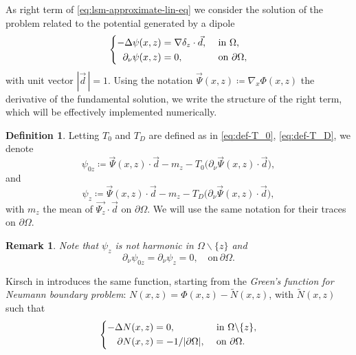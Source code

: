 \documentclass[10pt, a4paper, twoside, openright]{book}
\theoremstyle{definition}
\newtheorem{definition}[subsection]{Definition}
\theoremstyle{plain}
\theoremstyle{plain}
\theoremstyle{plain}
\theoremstyle{plain}
\newtheorem{remark}[subsection]{Remark}
\theoremstyle{plain}
\theoremstyle{plain}
\theoremstyle{plain}
\theoremstyle{plain}
\begin{document}
 As right term of \eqref{eq:lsm-approximate-lin-eq} we consider the solution of the problem related to the potential generated by a dipole
 \begin{equation}
 \left\{
 \begin{aligned}
   -\Delta \psi(x,z) &= \nabla\delta_{z} \cdot \vec{d}, && \textup{ in }\Omega ,\\
   \partial_\nu\psi(x,z) &= 0, &&\textup{ on }\partial \Omega,
 \end{aligned}
 \right.
 \end{equation}
 with unit vector $|\vec{d}\,|=1$. Using the notation $\vec{\Psi}(x,z)\coloneqq\nabla_x\Phi(x,z)$ the derivative of the fundamental solution, we write the structure of the right term, which will be effectively implemented numerically.
 \begin{definition}
 \label{def:lsm-psi}
  Letting $T_0$ and $T_D$ are defined as in \eqref{eq:def-T_0}, \eqref{eq:def-T_D}, we denote
 \begin{equation}
 \psi_{0z} \coloneqq \vec{\Psi}(x,z)\cdot\vec{d} - m_z - T_0\bigl(\partial_\nu \vec{\Psi}(x,z) \cdot \vec{d}\bigr),
  \end{equation}
  and
  \begin{equation}
  \psi_{z} \coloneqq \vec{\Psi}(x,z)\cdot\vec{d} - m_z - T_D\bigl(\partial_\nu \vec{\Psi}(x,z) \cdot \vec{d}\bigr),
  \end{equation}
  with $m_z$ the mean of $\vec{\Psi_z}\cdot\vec{d}$ on $\partial \Omega$. We will use the same notation for their traces on $\partial \Omega$.
 \end{definition}
 \begin{remark}
  Note that $\psi_z$ is not harmonic in $\Omega\backslash\{z\}$ and
  \begin{equation*}
  \partial_\nu \psi_{0z} = \partial_\nu \psi_z = 0,\quad\text{on}\,\partial \Omega.
  \end{equation*}
 \end{remark}
 Kirsch in \cite{kirsch:book} introduces the same function, starting from the \emph{Green's function for Neumann boundary problem}: $N(x,z)=\Phi(x,z)-\tilde{N}(x,z)$, with $\tilde{N}(x,z)$ such that
 \begin{equation}
 \left\{
 \begin{aligned}
   -\Delta N(x,z) &= 0, &&\textup{ in }\Omega\backslash\{z\} ,\\
   \partial N(x,z) &= -1/|\partial \Omega|,&&\textup{ on }\partial \Omega.
 \end{aligned}
 \right.
 \end{equation}
\end{document}
